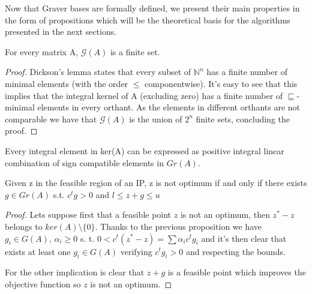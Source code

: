 
Now that Graver bases are formally defined, we present their main properties in the form of propositions which will be the theoretical basis for the algorithms presented in the next sections.

\begin{proposition}
For every matrix A, $\mathcal{G}(A)$ is a finite set.
\end{proposition}
\vspace{-20pt}
\begin{proof}
Dickson's lemma states that every subset of $\mathbb{N}^n$ has a finite number of minimal elements (with the order $\leq$ componentwise). It's easy to see that this implies that the integral kernel of A (excluding zero) has a finite number of $\sqsubseteq$-minimal elements in every orthant. As the elements in different orthants are not comparable we have that $\mathcal{G}(A)$ is the union of $2^n$ finite sets, concluding the proof.
\end{proof}


\begin{proposition}
Every integral element in ker(A) can be expressed as positive integral linear combination of sign compatible elements in $Gr(A)$.
\end{proposition}


\begin{proposition}
Given z in the feasible region of an IP, z is not optimum if and only if there exists $g \in Gr(A)$ s.t. $c^tg > 0$ and $l \leq z + g \leq u$
\end{proposition}

\begin{proof}
Lets suppose first that a feasible point $z$ is not an optimum, then $z^* - z$ belongs to $ker(A)\setminus\{0\}$. Thanks to the previous proposition we have $g_i \in G(A)$, $\alpha_i \geq 0$ s. t. $0 < c^t(z^* - z) = \sum \alpha_i c^t g_i$ and it's then clear that exists at least one $g_i \in G(A)$ verifying $c^tg_i > 0$ and respecting the bounds.

For the other implication is clear that $z + g$ is a feasible point which improves the objective function so $z$ is not an optimum. 
\end{proof}

